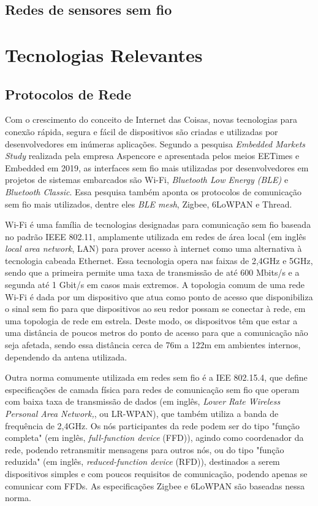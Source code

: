 \documentclass[../monografia.tex]{subfiles}
\begin{document}
\subsection{Redes de sensores sem fio}


\section{Tecnologias Relevantes} 
\subsection{Protocolos de Rede} 

Com o crescimento do conceito de Internet das Coisas, novas tecnologias para conexão rápida, segura e fácil de dispositivos são criadas e utilizadas por desenvolvedores em inúmeras aplicações. Segundo a pesquisa \textit{Embedded Markets Study} realizada pela empresa Aspencore\cite{embedded-market-study} e apresentada pelos meios EETimes\cite{eetimes} e Embedded\cite{embedded} em 2019, as interfaces sem fio mais utilizadas por desenvolvedores em  projetos de sistemas embarcados são Wi-Fi, \textit{Bluetooth Low Energy (BLE)} e \textit{Bluetooth Classic}. Essa pesquisa também aponta os protocolos de comunicação sem fio mais utilizados, dentre eles \textit{BLE mesh}, Zigbee, 6LoWPAN e Thread. 

Wi-Fi é uma família de tecnologias designadas para comunicação sem fio baseada no padrão IEEE 802.11\cite{802.11}, amplamente utilizada em redes de área local (em inglês \textit{local area network}, LAN) para prover acesso à internet como uma alternativa à tecnologia cabeada Ethernet. Essa tecnologia opera nas faixas de 2,4GHz e 5GHz, sendo que a primeira permite uma taxa de transmissão de até 600 Mbits/s e a segunda até 1 Gbit/s em casos mais extremos\cite{Wi-Fi-datarate}. A topologia comum de uma rede Wi-Fi é dada por um  dispositivo que atua como ponto de acesso que disponibiliza o sinal sem fio para que dispositivos ao seu redor possam se conectar à rede, em uma topologia de rede em estrela. Deste modo, os dispositvos têm que estar a uma distância de poucos metros do ponto de acesso para que a comunicação não seja afetada, sendo essa distância cerca de 76m a 122m em ambientes internos\cite{wifi-range}, dependendo da antena utilizada.

Outra norma comumente utilizada em redes sem fio é a IEE 802.15.4, que define especificações de camada física para redes de comunicação sem fio que operam com baixa taxa de transmissão de dados (em inglês, \textit{Lower Rate Wireless Personal Area Network,}, ou LR-WPAN), que também utiliza a banda de frequência de 2,4GHz\cite{802.15.4}. Os nós participantes da rede podem ser do tipo "função completa" (em inglês, \textit{full-function device} (FFD)), agindo como coordenador da rede, podendo retransmitir mensagens para outros nós, ou do tipo "função reduzida" (em inglês, \textit{reduced-function device} (RFD)), destinados a serem dispositivos simples e com poucos requisitos de comunicação, podendo apenas se comunicar com FFDs. As especificações Zigbee e 6LoWPAN são baseadas nessa norma.
\end{document}
